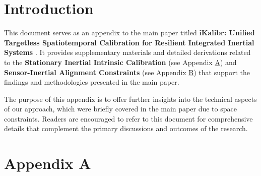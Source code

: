 \documentclass[lettersize,journal,twoside]{IEEEtran}
\begin{document}
\section{Introduction}
This document serves as an appendix to the main paper titled \textbf{iKalibr: Unified Targetless Spatiotemporal Calibration for Resilient Integrated Inertial Systems} \cite{chen2024ikalibr}. It provides supplementary materials and detailed derivations related to the \textbf{Stationary Inertial Intrinsic Calibration} (see Appendix \hyperref[sect:app_inertial_intri_calib]{A}) and \textbf{Sensor-Inertial Alignment Constraints} (see Appendix \hyperref[sect:app_alignment]{B}) that support the findings and methodologies presented in the main paper.

The purpose of this appendix is to offer further insights into the technical aspects of our approach, which were briefly covered in the main paper due to space constraints. Readers are encouraged to refer to this document for comprehensive details that complement the primary discussions and outcomes of the research.



\section*{Appendix A}
\end{document}
